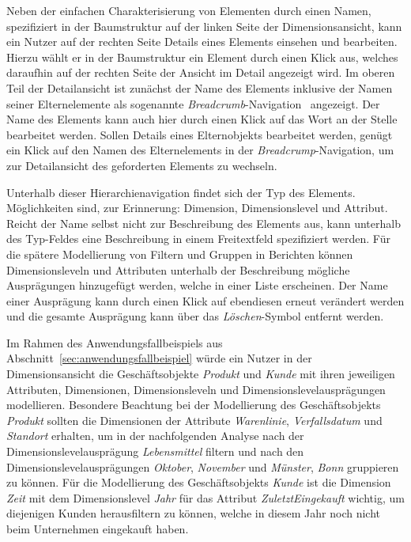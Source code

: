 \documentclass[
  language=german, %
  type=bachelor,%
  ngerman
]{isthesis}
\begin{document}
\begin{content}
  Neben der einfachen Charakterisierung von Elementen durch einen Namen,
  spezifiziert in der Baumstruktur auf der linken Seite der Dimensionsansicht,
  kann ein Nutzer auf der rechten Seite Details eines Elements einsehen und
  bearbeiten.  Hierzu wählt er in der Baumstruktur ein Element durch einen
  Klick aus, welches daraufhin auf der rechten Seite der Ansicht im Detail
  angezeigt wird. Im oberen Teil der Detailansicht ist zunächst der Name des
  Elements inklusive der Namen seiner Elternelemente als sogenannte
  \textit{Breadcrumb}-Navigation~\cite[][S. 1316]{maldonado2002common}
  angezeigt.  Der Name des Elements kann auch hier durch einen Klick auf das
  Wort an der Stelle bearbeitet werden. Sollen Details eines Elternobjekts
  bearbeitet werden, genügt ein Klick auf den Namen des Elternelements in der
  \textit{Breadcrump}-Navigation, um zur Detailansicht des geforderten Elements
  zu wechseln. 

  Unterhalb dieser Hierarchienavigation findet sich der Typ des Elements.
  Möglichkeiten sind, zur Erinnerung: Dimension, Dimensionslevel und Attribut.
  Reicht der Name selbst nicht zur Beschreibung des Elements aus, kann
  unterhalb des Typ-Feldes eine Beschreibung in einem Freitextfeld spezifiziert
  werden. Für die spätere Modellierung von Filtern und Gruppen in Berichten
  können Dimensionsleveln und Attributen unterhalb der Beschreibung mögliche
  Ausprägungen hinzugefügt werden, welche in einer Liste erscheinen. Der Name
  einer Ausprägung kann durch einen Klick auf ebendiesen erneut verändert
  werden und die gesamte Ausprägung kann über das
  \textit{Löschen}-Symbol entfernt werden.

  Im Rahmen des Anwendungsfallbeispiels aus
  Abschnitt~\ref{sec:anwendungsfallbeispiel} würde ein Nutzer in der
  Dimensionsansicht die Geschäftsobjekte \textit{Produkt} und \textit{Kunde}
  mit ihren jeweiligen Attributen, Dimensionen, Dimensionsleveln und
  Dimensionslevelausprägungen modellieren. Besondere Beachtung bei der
  Modellierung des Geschäftsobjekts \textit{Produkt} sollten die Dimensionen
  der Attribute \textit{Warenlinie}, \textit{Verfallsdatum} und
  \textit{Standort} erhalten, um in der nachfolgenden Analyse nach der
  Dimensionslevelausprägung \textit{Lebensmittel} filtern und nach den
  Dimensionslevelausprägungen \textit{Oktober}, \textit{November} und
  \textit{Münster}, \textit{Bonn} gruppieren zu können. Für die Modellierung
  des Geschäftsobjekts \textit{Kunde} ist die Dimension \textit{Zeit} mit dem
  Dimensionslevel \textit{Jahr} für das Attribut \textit{Zuletzt\-Eingekauft}
  wichtig, um diejenigen Kunden herausfiltern zu können, welche in diesem Jahr
  noch nicht beim Unternehmen eingekauft haben.



\end{content}
\end{document}
